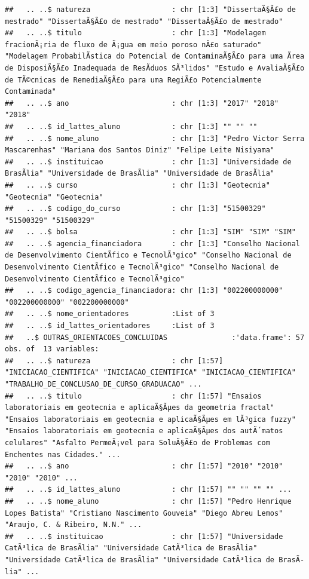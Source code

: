\documentclass[]{article}
\begin{document}
\begin{verbatim}
##   .. ..$ natureza                   : chr [1:3] "DissertaÃ§Ã£o de mestrado" "DissertaÃ§Ã£o de mestrado" "DissertaÃ§Ã£o de mestrado"
##   .. ..$ titulo                     : chr [1:3] "Modelagem fracionÃ¡ria de fluxo de Ã¡gua em meio poroso nÃ£o saturado" "Modelagem ProbabilÃ­stica do Potencial de ContaminaÃ§Ã£o para uma Ãrea de DisposiÃ§Ã£o Inadequada de ResÃ­duos SÃ³lidos" "Estudo e AvaliaÃ§Ã£o de TÃ©cnicas de RemediaÃ§Ã£o para uma RegiÃ£o Potencialmente Contaminada"
##   .. ..$ ano                        : chr [1:3] "2017" "2018" "2018"
##   .. ..$ id_lattes_aluno            : chr [1:3] "" "" ""
##   .. ..$ nome_aluno                 : chr [1:3] "Pedro Victor Serra Mascarenhas" "Mariana dos Santos Diniz" "Felipe Leite Nisiyama"
##   .. ..$ instituicao                : chr [1:3] "Universidade de BrasÃ­lia" "Universidade de BrasÃ­lia" "Universidade de BrasÃ­lia"
##   .. ..$ curso                      : chr [1:3] "Geotecnia" "Geotecnia" "Geotecnia"
##   .. ..$ codigo_do_curso            : chr [1:3] "51500329" "51500329" "51500329"
##   .. ..$ bolsa                      : chr [1:3] "SIM" "SIM" "SIM"
##   .. ..$ agencia_financiadora       : chr [1:3] "Conselho Nacional de Desenvolvimento CientÃ­fico e TecnolÃ³gico" "Conselho Nacional de Desenvolvimento CientÃ­fico e TecnolÃ³gico" "Conselho Nacional de Desenvolvimento CientÃ­fico e TecnolÃ³gico"
##   .. ..$ codigo_agencia_financiadora: chr [1:3] "002200000000" "002200000000" "002200000000"
##   .. ..$ nome_orientadores          :List of 3
##   .. ..$ id_lattes_orientadores     :List of 3
##   ..$ OUTRAS_ORIENTACOES_CONCLUIDAS               :'data.frame': 57 obs. of  13 variables:
##   .. ..$ natureza                   : chr [1:57] "INICIACAO_CIENTIFICA" "INICIACAO_CIENTIFICA" "INICIACAO_CIENTIFICA" "TRABALHO_DE_CONCLUSAO_DE_CURSO_GRADUACAO" ...
##   .. ..$ titulo                     : chr [1:57] "Ensaios laboratoriais em geotecnia e aplicaÃ§Ãµes da geometria fractal" "Ensaios laboratoriais em geotecnia e aplicaÃ§Ãµes em lÃ³gica fuzzy" "Ensaios laboratoriais em geotecnia e aplicaÃ§Ãµes dos autÃ´matos celulares" "Asfalto PermeÃ¡vel para SoluÃ§Ã£o de Problemas com Enchentes nas Cidades." ...
##   .. ..$ ano                        : chr [1:57] "2010" "2010" "2010" "2010" ...
##   .. ..$ id_lattes_aluno            : chr [1:57] "" "" "" "" ...
##   .. ..$ nome_aluno                 : chr [1:57] "Pedro Henrique Lopes Batista" "Cristiano Nascimento Gouveia" "Diego Abreu Lemos" "Araujo, C. & Ribeiro, N.N." ...
##   .. ..$ instituicao                : chr [1:57] "Universidade CatÃ³lica de BrasÃ­lia" "Universidade CatÃ³lica de BrasÃ­lia" "Universidade CatÃ³lica de BrasÃ­lia" "Universidade CatÃ³lica de BrasÃ­lia" ...

\end{verbatim}
\end{document}
